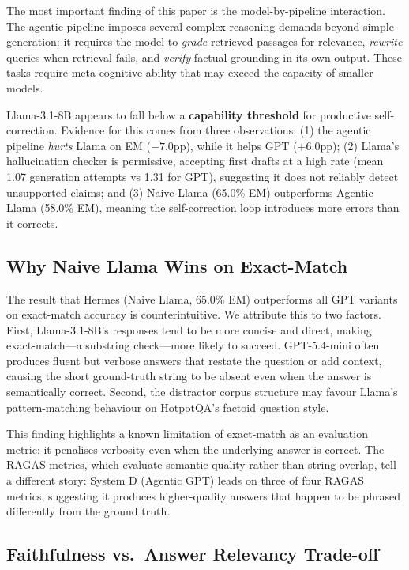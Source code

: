 \documentclass[12pt]{article}
\begin{document}
The most important finding of this paper is the model-by-pipeline interaction.
The agentic pipeline imposes several complex reasoning demands beyond simple
generation: it requires the model to \emph{grade} retrieved passages
for relevance, \emph{rewrite} queries when retrieval fails, and
\emph{verify} factual grounding in its own output.  These tasks require
meta-cognitive ability that may exceed the capacity of smaller models.

Llama-3.1-8B appears to fall below a \textbf{capability threshold} for
productive self-correction.  Evidence for this comes from three observations:
(1) the agentic pipeline \emph{hurts} Llama on EM ($-7.0$pp), while it helps
GPT ($+6.0$pp); (2) Llama's hallucination checker is permissive, accepting
first drafts at a high rate (mean 1.07 generation attempts vs 1.31 for GPT),
suggesting it does not reliably detect unsupported claims; and (3) Naive Llama
(65.0\% EM) outperforms Agentic Llama (58.0\% EM), meaning the self-correction
loop introduces more errors than it corrects.

\subsection{Why Naive Llama Wins on Exact-Match}

The result that Hermes (Naive Llama, 65.0\% EM) outperforms all GPT variants
on exact-match accuracy is counterintuitive.  We attribute this to two factors.
First, Llama-3.1-8B's responses tend to be more concise and direct, making
exact-match---a substring check---more likely to succeed.  GPT-5.4-mini often
produces fluent but verbose answers that restate the question or add context,
causing the short ground-truth string to be absent even when the answer is
semantically correct.  Second, the distractor corpus structure may favour
Llama's pattern-matching behaviour on HotpotQA's factoid question style.

This finding highlights a known limitation of exact-match as an evaluation
metric: it penalises verbosity even when the underlying answer is correct.
The RAGAS metrics, which evaluate semantic quality rather than string overlap,
tell a different story: System D (Agentic GPT) leads on three of four RAGAS
metrics, suggesting it produces higher-quality answers that happen to be
phrased differently from the ground truth.

\subsection{Faithfulness vs.\ Answer Relevancy Trade-off}
\end{document}
